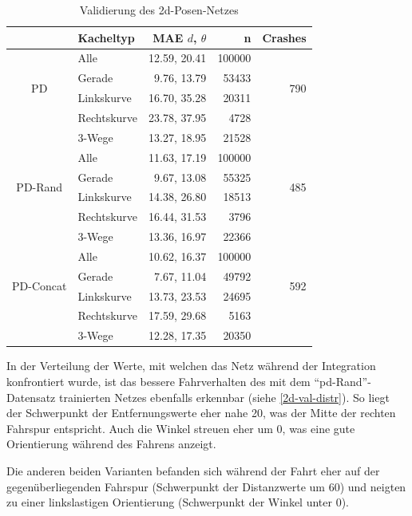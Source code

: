 \begin{table}[H]
	\centering
	\begin{tabular}[t]{|c|l|r|r|r|}
		\hline
		& \textbf{Kacheltyp} & \textbf{MAE $d$, $\theta$} & \textbf{n} & Crashes \\
		\hline
		\multirow{4}{*}{PD} 
		& Alle
		& 12.59, 20.41
		& 100000
		& \multirow{4}{*}{790}\\
		\cline{2-4}
		& Gerade
		&  9.76, 13.79
		& 53433
		&\\
		\cline{2-4}
		& Linkskurve
		& 16.70,  35.28
		& 20311
		&\\
		\cline{2-4}
		& Rechtskurve
		& 23.78, 37.95 
		& 4728
		&\\
		\cline{2-4}
		& 3-Wege
		&  13.27, 18.95
		& 21528
		&\\
		\hline
		\multirow{4}{*}{PD-Rand} 
		& Alle
		& 11.63, 17.19
		& 100000
		& \multirow{4}{*}{485}\\
		\cline{2-4}
		& Gerade
		&  9.67, 13.08
		& 55325 & \\
		\cline{2-4}
		& Linkskurve
		& 14.38, 26.80
		& 18513
		&\\
		\cline{2-4}
		& Rechtskurve
		& 16.44, 31.53
		& 3796
		&\\
		\cline{2-4}
		& 3-Wege
		& 13.36, 16.97
		& 22366
		&\\
		\hline
		\multirow{4}{*}{PD-Concat} 
		& Alle
		& 10.62, 16.37
		& 100000
		& \multirow{4}{*}{592}\\
		\cline{2-4}
		& Gerade
		& 7.67, 11.04
		& 49792
		&\\
		\cline{2-4}
		& Linkskurve
		& 13.73, 23.53
		& 24695
		&\\
		\cline{2-4}
		& Rechtskurve
		& 17.59, 29.68
		& 5163
		&\\
		\cline{2-4}
		& 3-Wege
		& 12.28, 17.35
		& 20350
		&\\
		\hline
	\end{tabular}
	\caption{Validierung des \acs{2d}-Posen-Netzes}
	\label{2d-validation}
\end{table}

In der Verteilung der Werte, mit welchen das Netz während der Integration konfrontiert wurde, ist das bessere Fahrverhalten des mit dem ``\acs{pd}-Rand''-Datensatz trainierten Netzes ebenfalls erkennbar (siehe \ref{2d-val-distr}). So liegt der Schwerpunkt der Entfernungswerte eher nahe 20, was der Mitte der rechten Fahrspur entspricht. Auch die Winkel streuen eher um 0, was eine gute Orientierung während des Fahrens anzeigt.

Die anderen beiden Varianten befanden sich während der Fahrt eher auf der gegenüberliegenden Fahrspur (Schwerpunkt der Distanzwerte um 60) und neigten zu einer linkslastigen Orientierung (Schwerpunkt der Winkel unter 0).

